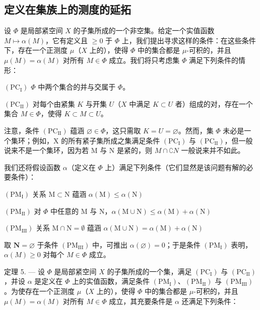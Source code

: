 \subsection{定义在集族上的测度的延拓}

设 \(\Phi\) 是局部紧空间 \(X\) 的子集所成的一个非空集。给定一个实值函数 \(M \mapsto \alpha(M)\)，它有定义且 \(\geqslant 0\) 于 \(\Phi\) 上，我们提出寻求这样的条件：在这些条件下，存在一个正测度 \(\mu\)（\(X\) 上的），使得 \(\Phi\) 中的集合都是 \(\mu\)-可积的，并且 \(\mu(M) = \alpha(M)\) 对所有 \(M \in \Phi\) 成立。我们将只考虑集 \(\Phi\) 满足下列条件的情形：

\((\mathrm{PC}_{\mathrm{I}})\) \(\Phi\) 中两个集合的并与交属于 \(\Phi\)。

\((\mathrm{PC}_{\mathrm{II}})\) 对每个由紧集 \(K\) 与开集 \(U\)（\(X\) 中满足 \(K \subset U\) 者）组成的对，存在一个集合 \(M \in \Phi\)，使得 \(K \subset M \subset U\)。

注意，条件 \((\mathrm{PC}_{\mathrm{II}})\) 蕴涵 \(\varnothing\in\Phi\)，这只需取 \(K=U=\varnothing\)。然而，集 \(\Phi\) 未必是一个集环；例如，X 的所有紧子集所成之集满足条件 \((\mathrm{PC}_{\mathrm{I}})\) 与 \((\mathrm{PC}_{\mathrm{II}})\)，但一般说来不是一个集环，因为若 M 与 N 是紧的，则 \(M\cap \complement N\) 一般说来并不如此。

我们还将假设函数 \(\alpha\)（定义在 \(\Phi\) 上）满足下列条件（它们显然是该问题有解的必要条件）：

\((\mathrm{PM}_{\mathrm{I}})\) 关系 \(\mathrm{M}\subset \mathrm{N}\) 蕴涵 \(\alpha (\mathrm{M})\leqslant \alpha (\mathrm{N})\)

\((\mathrm{PM}_{\mathrm{II}})\) 对 \(\Phi\) 中任意的 M 与 N，\(\alpha (\mathrm{M}\cup \mathrm{N})\leqslant \alpha (\mathrm{M}) + \alpha (\mathrm{N})\)

\((\mathrm{PM}_{\mathrm{III}})\) 关系 \(\mathrm{M}\cap \mathrm{N} = \emptyset\) 蕴涵 \(\alpha (\mathrm{M}\cup \mathrm{N}) = \alpha (\mathrm{M}) + \alpha (\mathrm{N})\)

取 \(\mathbf{N} = \varnothing\) 于条件 \((\mathrm{PM}_{\mathrm{III}})\) 中，可推出 \(\alpha(\varnothing) = 0\)；于是条件 \((\mathrm{PM}_{\mathrm{I}})\) 表明，\(\alpha(M) \geqslant 0\) 对每个 \(M \in \Phi\) 成立。

定理 5. --- 设 \(\Phi\) 是局部紧空间 \(X\) 的子集所成的一个集，满足 \((\mathrm{PC}_{\mathrm{I}})\) 与 \((\mathrm{PC}_{\mathrm{II}})\)，并设 \(\alpha\) 是定义在 \(\Phi\) 上的实值函数，满足条件 \((\mathrm{PM}_{\mathrm{I}})\)、\((\mathrm{PM}_{\mathrm{II}})\) 与 \((\mathrm{PM}_{\mathrm{III}})\)。为使存在一个正测度 \(\mu\)（\(X\) 上的），使得 \(\Phi\) 中的集合都是 \(\mu\)-可积的，并且 \(\mu(M) = \alpha(M)\) 对所有 \(M \in \Phi\) 成立，其充要条件是 \(\alpha\) 还满足下列条件：

